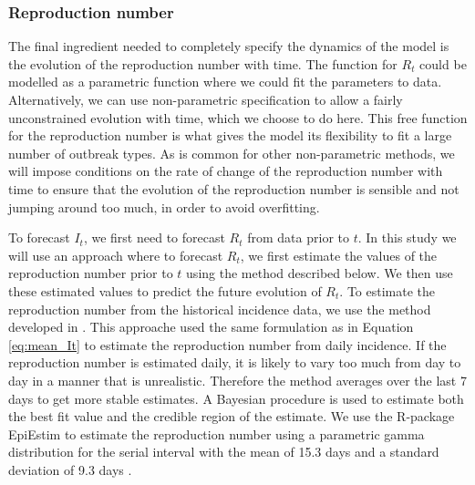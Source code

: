 \documentclass[12pt]{article}
\begin{document}
\subsubsection{Reproduction number}
The final ingredient needed to completely specify the dynamics of the model is the evolution of the reproduction number with time. The function for $R_t$ could be modelled as a parametric function where we could fit the parameters to data. Alternatively, we can use non-parametric specification to allow a fairly unconstrained evolution with time, which we choose to do here. This free function for the reproduction number is what gives the model its flexibility to fit a large number of outbreak types. As is common for other non-parametric methods, we will impose conditions on the rate of change of the reproduction number with time to ensure that the evolution of the reproduction number is sensible and not jumping around too much, in order to avoid overfitting.


To forecast $I_t$, we first need to forecast $R_t$ from data prior to $t$. In this study we will use an approach where to forecast $R_t$, we first estimate the values of the reproduction number prior to $t$ using the method described below. We then use these estimated values to predict the future evolution of $R_t$. To estimate the reproduction number from the historical incidence data, we use the method developed in \cite{coriNewFrameworkSoftware2013,thompsonImprovedInferenceTimevarying2019}. This approache used the same formulation as in Equation \ref{eq:mean_It} to estimate the reproduction number from daily incidence. If the reproduction number is estimated daily, it is likely to vary too much from day to day in a manner that is unrealistic. Therefore the method averages over the last 7 days to get more stable estimates. A Bayesian procedure is used to estimate both the best fit value and the credible region of the estimate. We use the R-package EpiEstim \cite{coriEpiEstimEpiEstimPackage2013} to estimate the reproduction number using a parametric gamma distribution for the serial interval with the mean of 15.3 days and a standard deviation of 9.3 days \cite{whoebolaresponseteamEbolaVirusDisease2014}.
\end{document}
